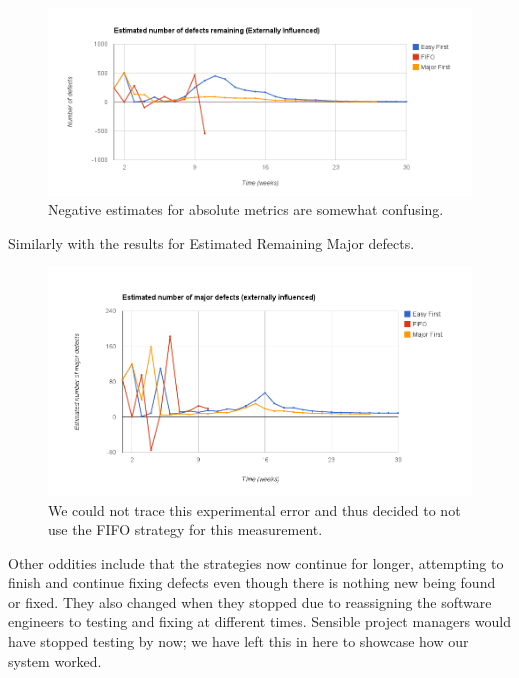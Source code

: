 \begin{figure}[ht!]
	\centering
	\includegraphics[scale=0.45]{graphs/EstRemDefs_ex.png}
	\caption{Negative estimates for absolute metrics are somewhat confusing.} 
	\label{ex_estremdefs}
\end{figure}

\pagebreak

Similarly with the results for Estimated Remaining Major defects.

\begin{figure}[ht!]
	\centering
	\includegraphics[scale=0.45]{graphs/EstRemMajDef_ex.png}
	\caption{We could not trace this experimental error and thus decided to not use the FIFO strategy
for this measurement.} 
	\label{ex_estremmajdef}
\end{figure}

Other oddities include that the strategies now continue for longer, attempting to finish and
continue fixing defects even though there is nothing new being found or fixed.
They also changed when they stopped due to reassigning the software engineers to testing and fixing
at different times.
Sensible project managers would have stopped testing by now; we have left this in here to showcase
how our system worked.

\pagebreak

